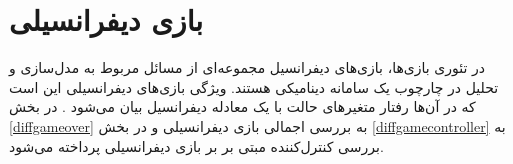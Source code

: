 \chapter{ بازی دیفرانسیلی}
در تئوری بازی‌ها، بازی‌های دیفرانسیل مجموعه‌ای از مسائل مربوط به مدل‌سازی و تحلیل در چارچوب یک سامانه دینامیکی هستند. ویژگی بازی‌های دیفرانسیلی این است که در آن‌ها رفتار متغیرهای حالت با یک معادله دیفرانسیل بیان می‌شود
\cite{diff_game}.
در بخش
\ref{diffgameover}
به بررسی اجمالی بازی دیفرانسیلی و در بخش
\ref{diffgamecontroller}
به بررسی کنترل‌کننده مبتی بر بر بازی دیفرانسیلی پرداخته می‌شود.
